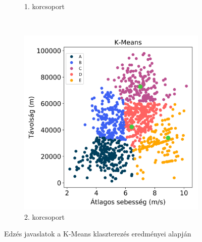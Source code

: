 \begin{figure}[!h]
\begin{subfigure}{.5\linewidth}
		\caption{1. korcsoport}
		\label{subfig:ageOneTraining}
	\end{subfigure}\\[1ex]
	\begin{subfigure}{.5\linewidth}
		\centering
		\includegraphics[width=\textwidth,keepaspectratio]{kepek/clustering/age_group_2_training_suggestions.png}
		\caption{2. korcsoport}
		\label{subfig:ageTwoTraining}
	\end{subfigure}
	\caption{Edzés javaslatok a K-Means klaszterezés eredményei alapján}
	\label{fig:traningSuggestions}
\end{figure}

